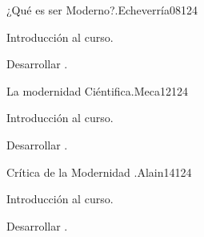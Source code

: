 \begin{syllabus}
\begin{unit}{¿Qué es ser Moderno?.}{}{Echeverría08}{12}{4}
   \begin{topics}
      \item Introducción al curso.
   \end{topics}
   \begin{learningoutcomes}
      \item Desarrollar .
   \end{learningoutcomes}
\end{unit}

\begin{unit}{La modernidad Ciéntifica.}{}{Meca12}{12}{4}
   \begin{topics}
      \item Introducción al curso.
   \end{topics}
   \begin{learningoutcomes}
      \item Desarrollar .
   \end{learningoutcomes}
\end{unit}

\begin{unit}{Crítica de la Modernidad  .}{}{Alain14}{12}{4}
   \begin{topics}
      \item Introducción al curso.
   \end{topics}
   \begin{learningoutcomes}
      \item Desarrollar .
   \end{learningoutcomes}
\end{unit}






\begin{coursebibliography}
\end{coursebibliography}

\end{syllabus}

